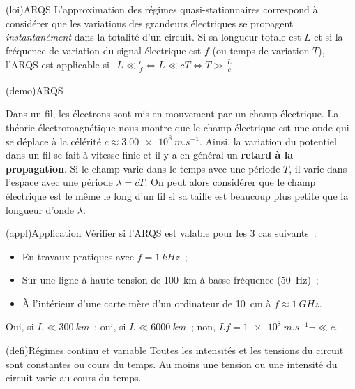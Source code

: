 \documentclass[../../main/main.tex]{subfiles}
\begin{document}
\sde[right](loi){ARQS}{
	L'approximation des régimes quasi-stationnaires correspond à considérer
	que les variations des grandeurs électriques se propagent
	\textit{instantanément} dans la totalité d'un circuit. Si sa longueur
	totale est $L$ et si la fréquence de variation du signal électrique est
	$f$ (ou temps de variation $T$), l'ARQS est applicable si
}{
	$
		\begin{gathered}
			L \ll \frac{c}{f}
			\Longleftrightarrow
			\boxed{L \ll cT}
			\Longleftrightarrow T \gg \frac{L}{c}
		\end{gathered}
	$
}
\begin{tcb}[label=demo:arqs](demo){ARQS}

	Dans un fil, les électrons sont mis en mouvement par un champ
	électrique. La théorie électromagnétique nous montre que le champ
	électrique est une onde qui se déplace à la célérité $c \approx
		\SI{3.00e8}{m.s^{-1}}$. Ainsi, la variation du potentiel dans un fil se
	fait à vitesse finie et il y a en général un \textbf{retard à la
		propagation}. Si le champ varie dans le temps avec une période $T$, il
	varie dans l'espace avec une période $\lambda = cT$. On peut alors
	considérer que le champ électrique est le même le long d'un fil si sa
	taille est beaucoup plus petite que la longueur d'onde $\lambda$.
\end{tcb}
\begin{tcb}(appl){Application}
	Vérifier si l'ARQS est valable pour les 3 cas suivants~:
	\begin{itemize}
		\item En travaux pratiques avec $f = \SI{1}{kHz}$~;
		\item Sur une ligne à haute tension de \SI{100}{km} à basse fréquence
		      (\SI{50}{Hz})~;
		\item À l'intérieur d'une carte mère d'un ordinateur de \SI{10}{cm} à
		      $f \approx \SI{1}{GHz}$.
	\end{itemize}
	\tcblower
	Oui, si $L \ll \SI{300}{km}$~; oui, si $L \ll \SI{6000}{km}$~; non, $Lf =
		\SI{1e8}{m.s^{-1}} \neg\ll c$.
\end{tcb}
\begin{tcb}[label=def:regimecontvar, sidebyside](defi){Régimes continu et variable}
	Toutes les intensités et les tensions du circuit
	sont constantes ou cours du temps.
	\tcblower
	Au moins une tension ou une intensité du circuit
	varie au cours du temps.
\end{tcb}
\end{document}

